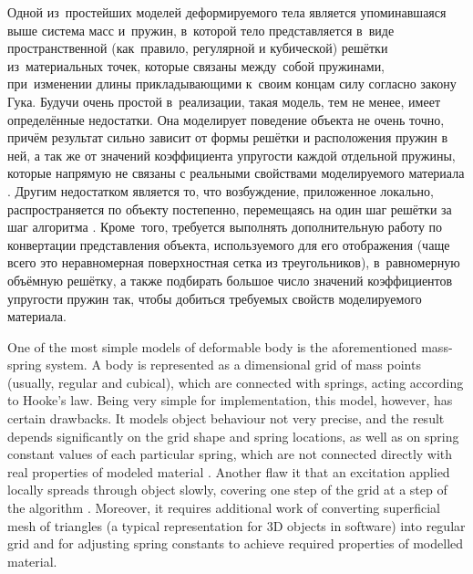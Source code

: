 \documentclass[a4paper, 12pt, titlepage]{extarticle}
\begin{document}
\begin{original}
    Одной из~простейших моделей деформируемого тела является упоминавшаяся выше система масс
    и~пружин, в~которой тело представляется в~виде пространственной (как~правило, регулярной и
    кубической) решётки из~материальных точек, которые связаны между~собой пружинами, при~изменении длины
    прикладывающими к~своим концам силу согласно закону Гука. Будучи очень простой в~реализации,
    такая модель, тем не менее, имеет определённые недостатки. Она моделирует поведение объекта не
    очень точно, причём результат сильно зависит от формы решётки и расположения пружин в ней, а так же от
    значений коэффициента упругости каждой отдельной пружины, которые напрямую не связаны с
    реальными свойствами моделируемого материала \cite[п.~3.5.2]{mueller-physmodels}.
    Другим недостатком является то, что возбуждение, приложенное локально, распространяется по
    объекту постепенно, перемещаясь на один шаг решётки за шаг алгоритма \cite[п.~4.4.1]{parent-animation}.
    Кроме~того, требуется выполнять дополнительную работу по конвертации представления объекта,
    используемого для его отображения (чаще всего это неравномерная поверхностная сетка из
    треугольников), в~равномерную объёмную решётку, а также подбирать большое число значений
    коэффициентов упругости пружин так, чтобы добиться требуемых свойств моделируемого материала.
\end{original}

    One of the most simple models of deformable body is the aforementioned mass-spring system.
    A body is represented as a dimensional grid of mass points (usually, regular and cubical),
    which are connected with springs, acting according to Hooke's law. Being very simple for
    implementation, this model, however, has certain drawbacks. It models object behaviour not
    very precise, and the result depends significantly on the grid shape and spring locations, as well as on
    spring constant values of each particular spring, which are not connected directly with real
    properties of modeled material \cite[sec. 3.5.2]{mueller-physmodels}. Another flaw it that an
    excitation applied locally spreads through object slowly, covering one step of the grid at a
    step of the algorithm \cite[sec. 4.4.1]{parent-animation}. Moreover, it requires additional work of converting
    superficial mesh of triangles (a typical representation for 3D objects in software) into regular
    grid and for adjusting spring constants to achieve required properties of modelled material.
\end{document}

